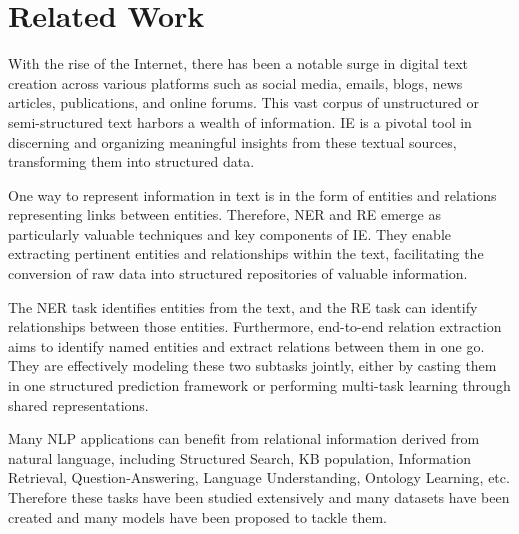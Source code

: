 \chapter{Related Work}
\label{chp:relatedWork}

With the rise of the Internet, there has been a notable surge in digital text creation across various platforms such as social media, emails, blogs, news articles, publications, and online forums. This vast corpus of unstructured or semi-structured text harbors a wealth of information. \ac{IE} is a pivotal tool in discerning and organizing meaningful insights from these textual sources, transforming them into structured data.

One way to represent information in text is in the form of entities and relations representing links between entities. Therefore, \ac{NER} and \ac{RE} emerge as particularly valuable techniques and key components of IE. They enable extracting pertinent entities and relationships within the text, facilitating the conversion of raw data into structured repositories of valuable information.

The NER task identifies entities from the text, and the RE task can identify relationships between those entities. Furthermore, end-to-end relation extraction aims to identify named entities and extract relations between them in one go. They are effectively modeling these two subtasks jointly\cite{Zhong2020AFE}, either by casting them in one structured prediction framework or performing multi-task learning through shared representations.

Many NLP applications can benefit from relational information derived from natural language\cite{Goyal2018RNE}, including Structured Search, \ac{KB} population, Information Retrieval, Question-Answering, Language Understanding, Ontology Learning, etc. Therefore these tasks have been studied extensively and many datasets have been created and many models have been proposed to tackle them.

